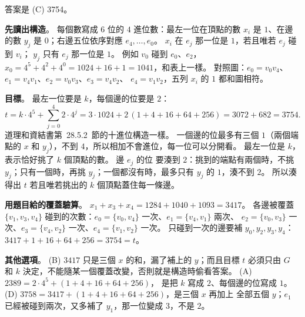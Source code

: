 \begin{pastsoln}
答案是 (C) 3754。

\textbf{先讀出構造}。 每個數寫成 $6$ 位的 $4$ 進位數：最左一位在頂點的數 $x_i$ 是 $1$、在邊的數 $y_j$
是 $0$；右邊五位依序對應 $e_4, \ldots, e_0$。 $x_i$ 在 $e_j$ 那一位是 $1$，若且唯若 $e_j$ 碰到 $v_i$；
$y_j$ 只有 $e_j$ 那一位是 $1$。 例如 $v_0$ 碰到 $e_0$、$e_2$，$x_0 = 4^5 + 4^2 + 4^0 = 1024 + 16 + 1 =
1041$，和表上一樣。 對照圖：$e_0 = v_0v_4$、$e_1 = v_4v_1$、$e_2 = v_0v_3$、$e_3 = v_4v_2$、
$e_4 = v_1v_2$，五列 $x_i$ 的 $1$ 都和圖相符。

\textbf{目標}。 最左一位要是 $k$，每個邊的位要是 $2$：
\[
t = k \cdot 4^5 + \sum_{j=0}^{4} 2 \cdot 4^j = 3 \cdot 1024 + 2\,(1 + 4 + 16 + 64 + 256) = 3072 + 682 = 3754.
\]
道理和資結書第~28.5.2~節的十進位構造一樣。 一個邊的位最多有三個 $1$（兩個端點的 $x$ 和 $y_j$），不到
$4$，所以相加不會進位，每一位可以分開看。 最左一位是 $k$，表示恰好挑了 $k$ 個頂點的數。 邊 $e_j$ 的位
要湊到 $2$：挑到的端點有兩個時，不挑 $y_j$；只有一個時，再挑 $y_j$；一個都沒有時，最多只有 $y_j$ 的
$1$，湊不到 $2$。 所以湊得出 $t$ 若且唯若挑出的 $k$ 個頂點蓋住每一條邊。

\textbf{用題目給的覆蓋驗算}。 $x_1 + x_3 + x_4 = 1284 + 1040 + 1093 = 3417$。 各邊被覆蓋
$\{v_1, v_3, v_4\}$ 碰到的次數：$e_0 = \{v_0, v_4\}$ 一次、$e_1 = \{v_4, v_1\}$ 兩次、
$e_2 = \{v_0, v_3\}$ 一次、$e_3 = \{v_4, v_2\}$ 一次、$e_4 = \{v_1, v_2\}$ 一次。 只碰到一次的邊要補
$y_0, y_2, y_3, y_4$：$3417 + 1 + 16 + 64 + 256 = 3754 = t$。

\textbf{其他選項}。 (B) $3417$ 只是三個 $x$ 的和，漏了補上的 $y$；而且目標 $t$ 必須只由 $G$ 和 $k$
決定，不能隨某一個覆蓋改變，否則就是構造時偷看答案。 (A) $2389 = 2 \cdot 4^5 + (1 + 4 + 16 + 64 + 256)$，
是把 $k$ 寫成 $2$、每個邊的位寫成 $1$。 (D) $3758 = 3417 + (1 + 4 + 16 + 64 + 256)$，是三個 $x$ 再加上
全部五個 $y$；$e_1$ 已經被碰到兩次，又多補了 $y_1$，那一位變成 $3$，不是 $2$。
\end{pastsoln}
